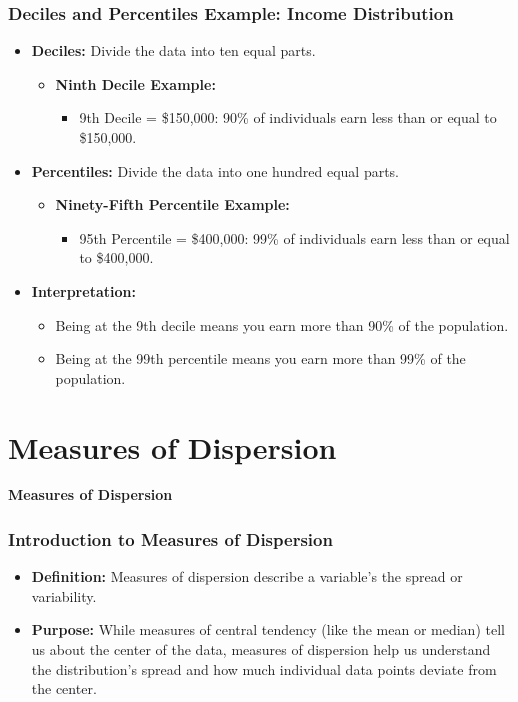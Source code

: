 \documentclass[handout]{beamer} %
\newcommand{\transitionslide}[1]{
    \begin{frame}[plain]
          \addtocounter{framenumber}{-1}
        \centering
        \vspace{1cm}
        \Huge
        \textcolor{moonstoneblue!150}{\textbf{#1}}
    \end{frame}
}
\begin{document}
\begin{frame}
\frametitle{Deciles and Percentiles Example: Income Distribution}
\begin{itemize}
    \item \textbf{Deciles:} Divide the data into ten equal parts.
    \begin{itemize}
        \item \textbf{Ninth Decile Example:}
            \begin{itemize}
                \item 9th Decile = \$150,000: 90\% of individuals earn less than or equal to \$150,000.
            \end{itemize}
    \end{itemize}
    \item \textbf{Percentiles:} Divide the data into one hundred equal parts.
    \begin{itemize}
        \item \textbf{Ninety-Fifth Percentile Example:}
            \begin{itemize}
                \item 95th Percentile = \$400,000: 99\% of individuals earn less than or equal to \$400,000.
            \end{itemize}
    \end{itemize}
    \item \textbf{Interpretation:}
    \begin{itemize}
        \item Being at the 9th decile means you earn more than 90\% of the population.
        \item Being at the 99th percentile means you earn more than 99\% of the population.
    \end{itemize}
\end{itemize}
\end{frame}

\section{Measures of Dispersion}
\transitionslide{Measures of Dispersion}

\begin{frame}
\frametitle{Introduction to Measures of Dispersion}
\begin{itemize}
    \item \textbf{Definition:} Measures of dispersion describe a variable's the spread or variability.
    \item \textbf{Purpose:} While measures of central tendency (like the mean or median) tell us about the center of the data, measures of dispersion help us understand the distribution's spread and how much individual data points deviate from the center.
\end{itemize}
\end{frame}
\end{document}
